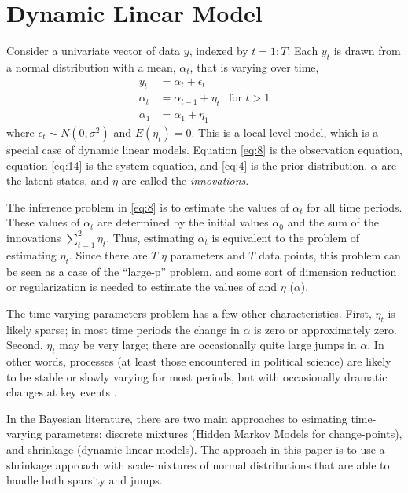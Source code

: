 \documentclass{article}
\begin{document}
\section{Dynamic Linear Model}

Consider a univariate vector of data $y$, indexed by $t = 1:T$.
Each $y_{t}$ is drawn from a normal distribution with a mean, $\alpha_{t}$, that is varying over time,
\begin{align}
  \label{eq:8}
  y_t &= \alpha_t + \epsilon_t \\
  \label{eq:14}
  \alpha_t &= \alpha_{t-1} + \eta_{t} & \text{for $t > 1$} \\
  \label{eq:19}
  \alpha_1 &= \alpha_{1} + \eta_{1}
\end{align}
where $\epsilon_{t} \sim N(0, \sigma^{2})$ and $E(\eta_{t}) = 0$.
This is a local level model, which is a special case of dynamic linear models.
Equation \eqref{eq:8} is the observation equation, 
equation \eqref{eq:14} is the system equation,
and \eqref{eq:4} is the prior distribution.
$\alpha$ are the latent states, and $\eta$ are called the \textit{innovations}.

The inference problem in \eqref{eq:8} is to estimate the values of $\alpha_{t}$ for all time periods.
These values of $\alpha_{t}$ are determined by the initial values $\alpha_{0}$ and the sum of the innovations $\sum_{t=1}^{2} \eta_{t}$.
Thus, estimating $\alpha_{t}$ is equivalent to the problem of estimating $\eta_{t}$.
Since there are $T$ $\eta$ parameters and $T$ data points, this problem can be seen as a case of the ``large-p'' problem, and some sort of dimension reduction or regularization is needed to estimate the values of and $\eta$ ($\alpha$).

The time-varying parameters problem has a few other characteristics. 
First, $\eta_{t}$ is likely sparse; in most time periods the change in $\alpha$ is zero or approximately zero.
Second, $\eta_{t}$ may be very large; there are occasionally quite large jumps in $\alpha$.
In other words, processes (at least those encountered in political science) are likely to be stable or slowly varying for most periods, but with occasionally dramatic changes at key events \parencite{RatkovicEng2010}.

In the Bayesian literature, there are two main approaches to esimating time-varying parameters: discrete mixtures (Hidden Markov Models for change-points), and shrinkage (dynamic linear models).
The approach in this paper is to use a shrinkage approach with scale-mixtures of normal distributions that are able to handle both sparsity and jumps.
\end{document}
